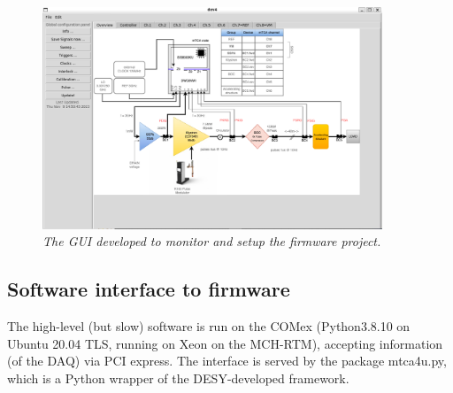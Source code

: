 \documentclass[12pt]{amsart}
\begin{document}
\begin{figure}[htbp] %
   \centering
   \includegraphics[width=4in]{im/gui2.png} 
   \caption{\em The GUI developed to monitor and setup the firmware project.}
   \label{fig:gui}
\end{figure}



\subsection{Software interface to firmware}

The high-level (but slow) software is run on the COMex (Python3.8.10 on Ubuntu 20.04 TLS, running on Xeon on the MCH-RTM), accepting information (of the DAQ) 
via PCI express. The interface is served by the package mtca4u.py, which is a Python wrapper of the DESY-developed framework.
%
%
%
%
%
%
\end{document}
